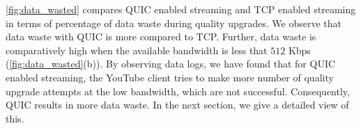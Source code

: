 \fig\ref{fig:data_wasted} compares QUIC enabled streaming and TCP enabled streaming in terms of percentage of data waste during quality upgrades. 
We observe that data waste with QUIC is more compared to TCP. Further, data waste is comparatively high when the available bandwidth is less that $512$ Kbps (\fig\ref{fig:data_wasted}(b)). 
By observing data logs, we have found that for QUIC enabled streaming, the YouTube client tries to make more number of quality upgrade attempts at the low bandwidth, which are not successful. 
Consequently, QUIC results in more data waste. In the next section, we give a detailed view of this. 



